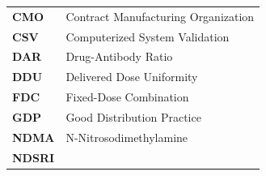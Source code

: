 \documentclass[
  11pt,
  a4paper,
]{report}
\begin{document}
\begin{longtable}[]{@{}ll@{}}
\begin{minipage}[t]{0.33\columnwidth}
\textbf{CMO}\strut
\end{minipage} & \begin{minipage}[t]{0.61\columnwidth}\raggedright
Contract Manufacturing Organization\strut
\end{minipage}\tabularnewline
\begin{minipage}[t]{0.33\columnwidth}\raggedright
\textbf{CSV}\strut
\end{minipage} & \begin{minipage}[t]{0.61\columnwidth}\raggedright
Computerized System Validation\strut
\end{minipage}\tabularnewline
\begin{minipage}[t]{0.33\columnwidth}\raggedright
\textbf{DAR}\strut
\end{minipage} & \begin{minipage}[t]{0.61\columnwidth}\raggedright
Drug-Antibody Ratio\strut
\end{minipage}\tabularnewline
\begin{minipage}[t]{0.33\columnwidth}\raggedright
\textbf{DDU}\strut
\end{minipage} & \begin{minipage}[t]{0.61\columnwidth}\raggedright
Delivered Dose Uniformity\strut
\end{minipage}\tabularnewline
\begin{minipage}[t]{0.33\columnwidth}\raggedright
\textbf{FDC}\strut
\end{minipage} & \begin{minipage}[t]{0.61\columnwidth}\raggedright
Fixed-Dose Combination\strut
\end{minipage}\tabularnewline
\begin{minipage}[t]{0.33\columnwidth}\raggedright
\textbf{GDP}\strut
\end{minipage} & \begin{minipage}[t]{0.61\columnwidth}\raggedright
Good Distribution Practice\strut
\end{minipage}\tabularnewline
\begin{minipage}[t]{0.33\columnwidth}\raggedright
\textbf{NDMA}\strut
\end{minipage} & \begin{minipage}[t]{0.61\columnwidth}\raggedright
N-Nitrosodimethylamine\strut
\end{minipage}\tabularnewline
\begin{minipage}[t]{0.33\columnwidth}\raggedright
\textbf{NDSRI}\strut
\end{minipage} & \begin{minipage}[t]{0.61\columnwidth}\raggedright

\end{minipage}
\end{longtable}
\end{document}
